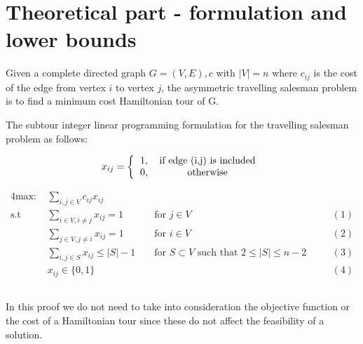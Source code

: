 \section{Theoretical part - formulation and lower bounds}
Given a complete directed graph $G = (V,E),c$ with $|V| = n$ where $c_{ij}$ is the cost of the edge from vertex $i$ to vertex $j$, the asymmetric travelling salesman problem is to find a minimum cost Hamiltonian tour of G.

The subtour integer linear programming formulation for the travelling salesman problem as follows:

\[ 
x_{ij} =
\left \{
  \begin{tabular}{cc}
  1, & if edge (i,j) is included\\
  0, & otherwise 
  \end{tabular}
\right .
\]

\begin{alignat*}{4}
\text{max: }    & \sum_{i,j \in V} c_{ij} x_{ij}\\
\text{s.t }     & \sum_{i \in V, i \neq j} x_{ij} = 1  && \text{ for } j \in V && (1)\\
                & \sum_{j \in V, j \neq i} x_{ij} = 1  && \text{ for } i \in V && (2)\\
                & \sum_{i,j \in S} x_{ij} \leq |S| - 1 && \text{ for } S \subset V \text{ such that } 2 \leq |S| \leq n - 2 \quad && (3)\\
                & x_{ij} \in \{0,1\} && && (4)
\end{alignat*}

\subsection{} %
In this proof we do not need to take into consideration the objective function or the cost of a Hamiltonian tour since these do not affect the feasibility of a solution.

